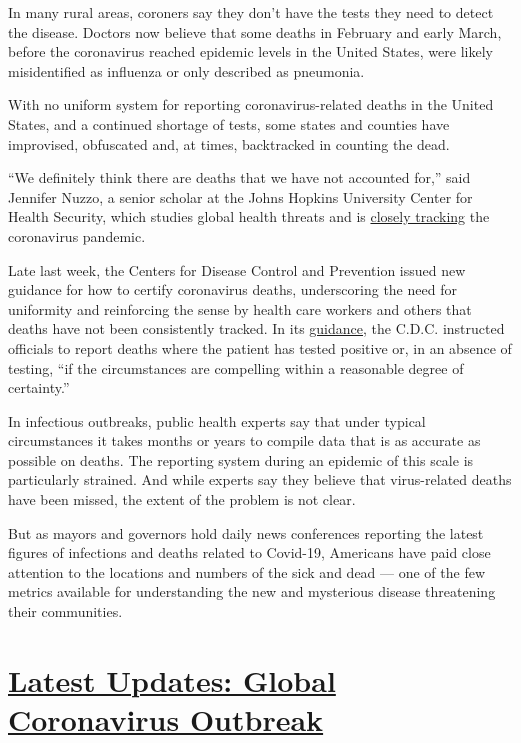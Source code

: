 In many rural areas, coroners say they don't have the tests they need to
detect the disease. Doctors now believe that some deaths in February and
early March, before the coronavirus reached epidemic levels in the
United States, were likely misidentified as influenza or only described
as pneumonia.

With no uniform system for reporting coronavirus-related deaths in the
United States, and a continued shortage of tests, some states and
counties have improvised, obfuscated and, at times, backtracked in
counting the dead.

``We definitely think there are deaths that we have not accounted for,''
said Jennifer Nuzzo, a senior scholar at the Johns Hopkins University
Center for Health Security, which studies global health threats and is
\href{http://www.centerforhealthsecurity.org/}{closely tracking} the
coronavirus pandemic.

Late last week, the Centers for Disease Control and Prevention issued
new guidance for how to certify coronavirus deaths, underscoring the
need for uniformity and reinforcing the sense by health care workers and
others that deaths have not been consistently tracked. In its
\href{https://www.cdc.gov/nchs/data/nvss/vsrg/vsrg03-508.pdf}{guidance},
the C.D.C. instructed officials to report deaths where the patient has
tested positive or, in an absence of testing, ``if the circumstances are
compelling within a reasonable degree of certainty.''

In infectious outbreaks, public health experts say that under typical
circumstances it takes months or years to compile data that is as
accurate as possible on deaths. The reporting system during an epidemic
of this scale is particularly strained. And while experts say they
believe that virus-related deaths have been missed, the extent of the
problem is not clear.

But as mayors and governors hold daily news conferences reporting the
latest figures of infections and deaths related to Covid-19, Americans
have paid close attention to the locations and numbers of the sick and
dead --- one of the few metrics available for understanding the new and
mysterious disease threatening their communities.

\hypertarget{latest-updates-global-coronavirus-outbreak}{%
\section{\texorpdfstring{\href{https://www.nytimes.com/2020/08/04/world/coronavirus-cases.html?action=click\&pgtype=Article\&state=default\&region=MAIN_CONTENT_1\&context=storylines_live_updates}{Latest
Updates: Global Coronavirus
Outbreak}}{Latest Updates: Global Coronavirus Outbreak}}\label{latest-updates-global-coronavirus-outbreak}}

